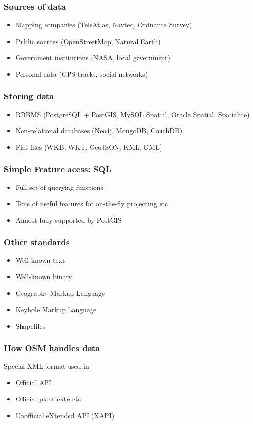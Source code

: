 \documentclass{beamer}
\begin{document}
\begin{frame}
  \frametitle{Sources of data}
  \begin{itemize}
  \item Mapping companies (TeleAtlas, Navteq, Ordnance Survey)
  \item Public sources (OpenStreetMap, Natural Earth)
  \item Government institutions (NASA, local government)
  \item Personal data (GPS tracks, social networks)
  \end{itemize}
\end{frame}

\begin{frame}
  \frametitle{Storing data}
  \begin{itemize}
  \item RDBMS (PostgreSQL + PostGIS, MySQL Spatial, Oracle Spatial, Spatialite)
  \item Non-relational databases (Neo4j, MongoDB, CouchDB)
  \item Flat files (WKB, WKT, GeoJSON, KML, GML)
  \end{itemize}
\end{frame}

\begin{frame}
  \frametitle{Simple Feature acess: SQL}
  \begin{itemize}
  \item Full set of querying functions
  \item Tons of useful features for on-the-fly projecting etc.
  \item Almost fully supported by PostGIS
  \end{itemize}
\end{frame}

\begin{frame}
  \frametitle{Other standards}
  \begin{itemize}
  \item Well-known text
  \item Well-known binary
  \item Geography Markup Language
  \item Keyhole Markup Language
  \item Shapefiles
  \end{itemize}
\end{frame}

\begin{frame}
  \frametitle{How OSM handles data}
  Special XML format used in
  \begin{itemize}
  \item Official API
  \item Official plant extracts
  \item Unofficial eXtended API (XAPI)
  \end{itemize}
\end{frame}
\end{document}
